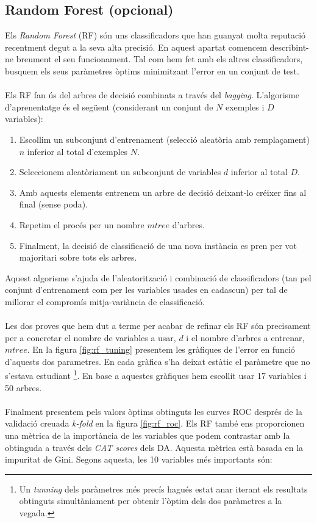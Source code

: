 \documentclass[a4paper,10pt]{article}
\begin{document}
\subsection{Random Forest (opcional)}
Els \textit{Random Forest} (RF) són uns classificadors que han guanyat molta reputació recentment degut a la seva alta precisió. En aquest apartat comencem describint-ne breument el seu funcionament. Tal com hem fet amb els altres classificadors, busquem els seus paràmetres òptims minimitzant l'error en un conjunt de test.
\\
\\
Els RF fan ús del arbres de decisió combinats a través del \textit{bagging}. L'algorisme d'aprenentatge és el següent (considerant un conjunt de $N$ exemples i $D$ variables):
\begin{enumerate}
\item Escollim un subconjunt d'entrenament (selecció aleatòria amb remplaçament) $n$ inferior al total d'exemples $N$.
\item Seleccionem aleatòriament un subconjunt de variables $d$ inferior al total $D$.
\item Amb aquests elements entrenem un arbre de decisió deixant-lo créixer fins al final (sense poda).
\item Repetim el procés per un nombre $mtree$ d'arbres.
\item Finalment, la decisió de classificació de una nova instància es pren per vot majoritari sobre tots els arbres.
\end{enumerate}
Aquest algorisme s'ajuda de l'aleatorització i combinació de classificadors (tan pel conjunt d'entrenament com per les variables usades en cadascun) per tal de millorar el compromís mitja-variància de classificació. 
\\
\\
Les dos proves que hem dut a terme per acabar de refinar els RF són precisament per a concretar el nombre de variables a usar, $d$ i el nombre d'arbres a entrenar, $mtree$. En la figura \ref{fig:rf_tuning} presentem les gràfiques de l'error en funció d'aquests dos parametres. En cada gràfica s'ha deixat estàtic el paràmetre que no s'estava estudiant \footnote{Un \textit{tunning} dels paràmetres més precís hagués estat anar iterant els resultats obtinguts simultàniament per obtenir l'òptim dels dos paràmetres a la vegada.}. En base a aquestes gràfiques hem escollit usar 17 variables i 50 arbres.
\\
\\
Finalment presentem pels valors òptims obtinguts les curves ROC després de la validació creuada \textit{k-fold} en la figura \ref{fig:rf_roc}. Els RF també ens proporcionen una mètrica de la importància de les variables que podem contrastar amb la obtinguda a través dels \textit{CAT scores} dels DA. Aquesta mètrica està basada en la impuritat de Gini. Segons aquesta, les 10 variables més importants són:
\end{document}
